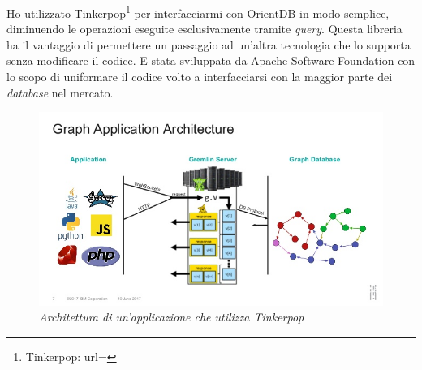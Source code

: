 Ho utilizzato Tinkerpop\footnote{Tinkerpop: url= } per interfacciarmi con OrientDB in modo semplice, diminuendo le operazioni eseguite esclusivamente tramite \textit{query}. Questa libreria ha il vantaggio di permettere un passaggio ad un'altra tecnologia che lo supporta senza modificare il codice. E stata sviluppata da Apache Software Foundation con lo scopo di uniformare il codice volto a interfacciarsi con la maggior parte dei \textit{database} nel mercato.
\begin{figure}[h!]
	\centering
	\includegraphics[scale=0.65]{immagini/tinkerpop.jpg}
	\caption{\textit{Architettura di un'applicazione che utilizza Tinkerpop} }
\end{figure}

